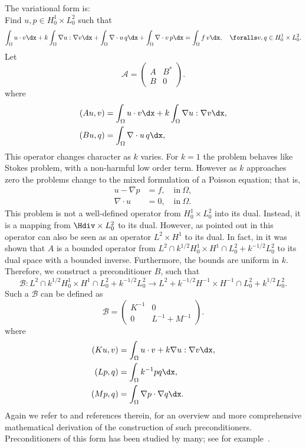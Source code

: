 The variational form is: \\
Find $u,p \in H^1_0 \times L_0^2$ such that
\[
\int_\Omega u \cdot v \dx +
k \int_\Omega \nabla u : \nabla v \dx +
\int_\Omega \nabla \cdot u \, q \dx +
\int_\Omega \nabla \cdot v \, p \dx = \int_\Omega f\, v \dx, \quad
\foralls v,q \in H^1_0 \times L_0^2.
\]
Let
\[
\mathcal{A}  =
\begin{pmatrix} A & B^* \\ B & 0 \end{pmatrix}.
\]
where
\begin{align}
(A u, v) &= \int_\Omega u \cdot v \dx +  k \int_\Omega \nabla u :
\nabla v \dx, \\
(B u, q) &= \int_\Omega \nabla \cdot u \, q \dx,
\end{align}
This operator changes character as $k$ varies.  For $k=1$ the problem
behaves like Stokes problem, with a non-harmful low order
term. However as $k$ approaches zero the problems change to the mixed
formulation of a Poisson equation; that is,
\begin{align}
u - \nabla p &= f, \quad \mbox{in} \ \Omega, \\
\nabla \cdot u  &= 0, \quad \mbox{in} \ \Omega.
\end{align}
This problem is not a well-defined operator from $H^1_0 \times L_0^2$
into its dual. Instead, it is a mapping from $\Hdiv \times L_0^2$ to
its dual.  However, as pointed out in \citet{MardalWinther2004} this
operator can also be seen as an operator $L^2 \times H^1$ to its dual.
In fact, in \citet{MardalTaiWinther2002,MardalWinther2004} it was
shown that $A$ is a bounded operator from $L^2 \cap k^{1/2}
H^1_0 \times H^1 \cap L_0^2 + k^{-1/2} L_0^2$ to its dual space with a
bounded inverse. Furthermore, the bounds are uniform in $k$.
Therefore, we construct a preconditioner $B$, such that
\[
\mathcal{B}: L^2 \cap k^{1/2} H^1_0 \times H^1 \cap L_0^2 + k^{-1/2} L_0^2 \rightarrow
L^2 + k^{-1/2} H^{-1} \times H^{-1} \cap L_0^2 + k^{1/2} L_0^2  .
\]
Such a $\mathcal{B}$ can be defined as
\[
\mathcal{B}
=
\begin{pmatrix} K^{-1} & 0 \\ 0 & L^{-1} + M^{-1} \end{pmatrix}.
\]
where
\begin{align}
(K u, v) &= \int_\Omega u\cdot v  +  k \nabla u: \nabla v \dx, \\
(L p, q) &= \int_\Omega k^{-1} p q \dx, \\
(M p, q) &= \int_\Omega \nabla p \cdot  \nabla q \dx.
\end{align}
Again we refer to \citet{MardalWinther11} and references therein, for
an overview and more comprehensive mathematical derivation of the
construction of such preconditioners.  Preconditioners of this form
has been studied by many; see for
example~\citet{CahouetChabard1988,ElmanSilvesterWathen2005,MardalWinther2004,MardalWinther11,Turek1999}.

